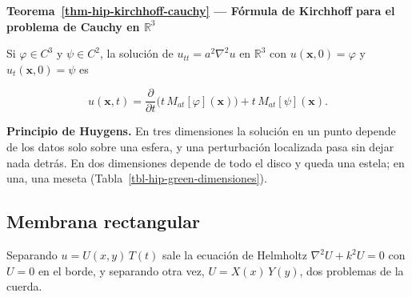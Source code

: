 \documentclass[
  spanish,
  a4paper,
]{scrbook}
\theoremstyle{definition}
\theoremstyle{plain}
\theoremstyle{definition}
\theoremstyle{plain}
\theoremstyle{definition}
\theoremstyle{remark}
\begin{document}
\begin{tcolorbox}[enhanced jigsaw, arc=.35mm, bottomrule=.15mm, breakable, colback=white, colframe=quarto-callout-note-color-frame, left=2mm, leftrule=.75mm, opacityback=0, rightrule=.15mm, toprule=.15mm]
\begin{minipage}[t]{5.5mm}
\textcolor{quarto-callout-note-color}{\faInfo}
\end{minipage}%
\begin{minipage}[t]{\textwidth - 5.5mm}

\vspace{-3mm}\textbf{Teorema~\ref{thm-hip-kirchhoff-cauchy} --- Fórmula de Kirchhoff para el
problema de Cauchy en \(\mathbb R^3\)}\vspace{3mm}

Si \(\varphi\in C^3\) y \(\psi\in C^2\), la solución de
\(u_{tt} = a^2\nabla^2u\) en \(\mathbb R^3\) con
\(u(\mathbf x,0) = \varphi\) y \(u_t(\mathbf x,0) = \psi\) es

\[
u(\mathbf x,t) = \frac{\partial}{\partial t}\Big(t\,M_{at}[\varphi](\mathbf x)\Big) + t\,M_{at}[\psi](\mathbf x).
\]

\end{minipage}%
\end{tcolorbox}

\textbf{Principio de Huygens.} En tres dimensiones la solución en un
punto depende de los datos solo sobre una esfera, y una perturbación
localizada pasa sin dejar nada detrás. En dos dimensiones depende de
todo el disco y queda una estela; en una, una meseta
(Tabla~\ref{tbl-hip-green-dimensiones}).

\subsection{Membrana rectangular}\label{sec-hip-resumen-5}

Separando \(u = U(x,y)\,T(t)\) sale la ecuación de Helmholtz
\(\nabla^2U + k^2U = 0\) con \(U = 0\) en el borde, y separando otra
vez, \(U = X(x)\,Y(y)\), dos problemas de la cuerda.
\end{document}
